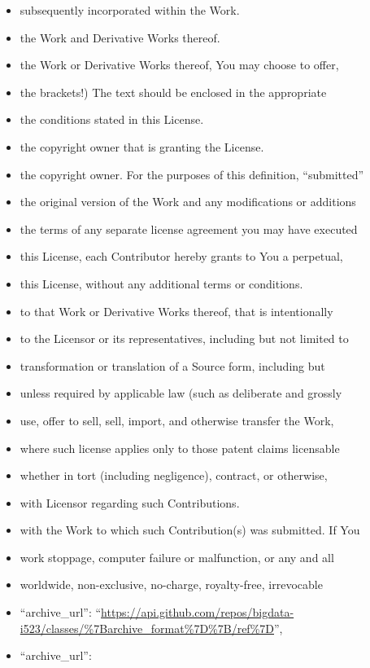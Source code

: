 \begin{itemize}
\item
  subsequently incorporated within the Work.
\item
  the Work and Derivative Works thereof.
\item
  the Work or Derivative Works thereof, You may choose to offer,
\item
  the brackets!) The text should be enclosed in the appropriate
\item
  the conditions stated in this License.
\item
  the copyright owner that is granting the License.
\item
  the copyright owner. For the purposes of this definition,
  ``submitted''
\item
  the original version of the Work and any modifications or additions
\item
  the terms of any separate license agreement you may have executed
\item
  this License, each Contributor hereby grants to You a perpetual,
\item
  this License, without any additional terms or conditions.
\item
  to that Work or Derivative Works thereof, that is intentionally
\item
  to the Licensor or its representatives, including but not limited to
\item
  transformation or translation of a Source form, including but
\item
  unless required by applicable law (such as deliberate and grossly
\item
  use, offer to sell, sell, import, and otherwise transfer the Work,
\item
  where such license applies only to those patent claims licensable
\item
  whether in tort (including negligence), contract, or otherwise,
\item
  with Licensor regarding such Contributions.
\item
  with the Work to which such Contribution(s) was submitted. If You
\item
  work stoppage, computer failure or malfunction, or any and all
\item
  worldwide, non-exclusive, no-charge, royalty-free, irrevocable
\item
  ``archive\_url'':
  ``\url{https://api.github.com/repos/bigdata-i523/classes/\%7Barchive_format\%7D\%7B/ref\%7D}'',
\item
  ``archive\_url'':

\end{itemize}
